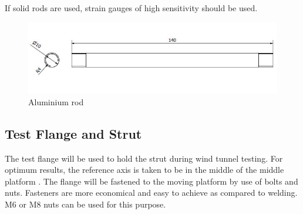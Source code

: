 If solid rods are used, strain gauges of high sensitivity should be used.
\begin{center}
	\begin{figure}[H]
	\centering
	\includegraphics[width=0.8\linewidth]{Figures/Rod}
	\caption[Aluminium rod]{Aluminium rod}
	\end{figure}
\end{center}

\subsection{Test Flange and Strut}
The test flange will be used to hold the strut during wind tunnel testing. For optimum results, the reference axis is taken to be in the middle of the middle platform \cite {fernandes_design_nodate}. The flange will be fastened to the moving platform by use of bolts and nuts. Fasteners are more economical and easy to achieve as compared to welding. M6 or M8 nuts can be used for this purpose.

